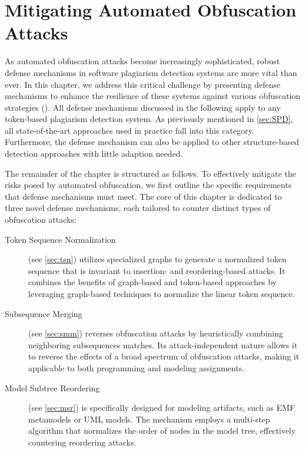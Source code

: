 \chapter[Mitigating Obfuscation Attacks]{Mitigating Automated Obfuscation Attacks}\label{cha:defense}

As automated obfuscation attacks become increasingly sophisticated, robust defense mechanisms in software plagiarism detection systems are more vital than ever. In this chapter, we address this critical challenge by presenting defense mechanisms to enhance the resilience of these systems against various obfuscation strategies (). All defense mechanisms discussed in the following apply to any token-based plagiarism detection system. As previously mentioned in \autoref{sec:SPD}, all state-of-the-art approaches used in practice fall into this category. Furthermore, the defense mechanism can also be applied to other structure-based detection approaches with little adaption needed.


The remainder of the chapter is structured as follows.
To effectively mitigate the risks posed by automated obfuscation, we first outline the specific requirements that defense mechanisms must meet.
%
The core of this chapter is dedicated to three novel defense mechanisms, each tailored to counter distinct types of obfuscation attacks:

\begin{description}
    \item[{Token Sequence Normalization}~\cite{Saglam2024b}] (see \autoref{sec:tsn}) utilizes specialized graphs to generate a normalized token sequence that is invariant to insertion- and reordering-based attacks. It combines the benefits of graph-based and token-based approaches by leveraging graph-based techniques to normalize the linear token sequence.

    \item[{Subsequence Merging}~\cite{Saglam2024c}] (see \autoref{sec:smm}) reverses obfuscation attacks by heuristically combining neighboring subsequences matches. Its attack-independent nature allows it to reverse the effects of a broad spectrum of obfuscation attacks, making it applicable to both programming and modeling assignments.

    \item[{Model Subtree Reordering}~\cite{Saglam2024a}] (see \autoref{sec:msr}) is specifically designed for modeling artifacts, such as \ac{EMF} metamodels or \ac{UML} models. The mechanism employs a multi-step algorithm that normalizes the order of nodes in the model tree, effectively countering reordering attacks.
\end{description}

